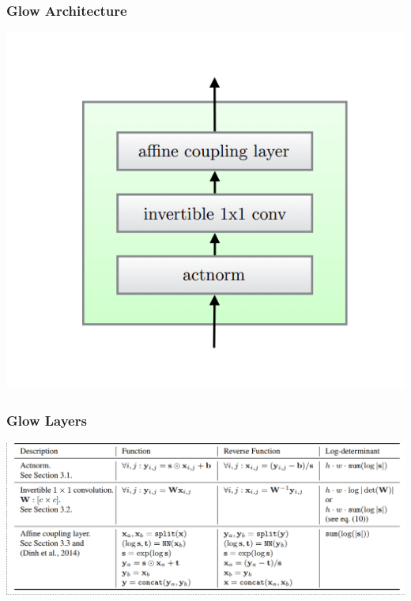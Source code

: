\documentclass{beamer}
\begin{document}
\begin{frame}
  \frametitle{Glow Architecture}

  \includegraphics[width=1.0\textwidth]{glow-single-block.png}
\end{frame}

\begin{frame}
  \frametitle{Glow Layers}

  \includegraphics[width=1.0\textwidth]{glow-layers-arch.png}
\end{frame}
\end{document}
